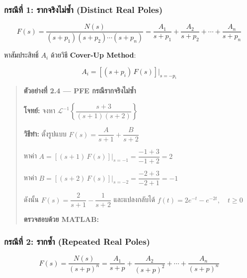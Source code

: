 \subsubsection{กรณีที่ 1: รากจริงไม่ซ้ำ (Distinct Real
Poles)}\label{uxe01uxe23uxe13uxe17-1-uxe23uxe32uxe01uxe08uxe23uxe07uxe44uxe21uxe0buxe33-distinct-real-poles}

\[F(s) = \frac{N(s)}{(s+p_1)(s+p_2)\cdots(s+p_n)} = \frac{A_1}{s+p_1} + \frac{A_2}{s+p_2} + \cdots + \frac{A_n}{s+p_n}\]

หาสัมประสิทธิ์ \(A_i\) ด้วยวิธี \textbf{Cover-Up Method}:

\[A_i = \left[(s+p_i)\,F(s)\right]\Big|_{s = -p_i}\]

\begin{quote}
\textbf{ตัวอย่างที่ 2.4 --- PFE กรณีรากจริงไม่ซ้ำ}

\textbf{โจทย์:} จงหา
\(\mathcal{L}^{-1}\!\left\{\dfrac{s+3}{(s+1)(s+2)}\right\}\)

\textbf{วิธีทำ:} ตั้งรูปแบบ \(F(s) = \dfrac{A}{s+1} + \dfrac{B}{s+2}\)

หาค่า \(A = [(s+1)\,F(s)]\big|_{s=-1} = \dfrac{-1+3}{-1+2} = 2\)

หาค่า \(B = [(s+2)\,F(s)]\big|_{s=-2} = \dfrac{-2+3}{-2+1} = -1\)

ดังนั้น \(F(s) = \dfrac{2}{s+1} - \dfrac{1}{s+2}\) และแปลงกลับได้
\(\boxed{f(t) = 2e^{-t} - e^{-2t},\quad t \geq 0}\)

\textbf{ตรวจสอบด้วย MATLAB:}

\begin{Shaded}
\begin{Highlighting}[]
 \OperatorTok{;}  \OperatorTok{=}\NormalTok{ (}\OperatorTok{+}\NormalTok{)}\OperatorTok{/}\NormalTok{((}\OperatorTok{+}\NormalTok{)}\OperatorTok{*}\NormalTok{(}\OperatorTok{+}\NormalTok{))}\OperatorTok{;} \NormalTok{(}\NormalTok{)}
\end{Highlighting}
\end{Shaded}
\end{quote}

\subsubsection{กรณีที่ 2: รากซ้ำ (Repeated Real
Poles)}\label{uxe01uxe23uxe13uxe17-2-uxe23uxe32uxe01uxe0buxe33-repeated-real-poles}

\[F(s) = \frac{N(s)}{(s+p)^n} = \frac{A_1}{s+p} + \frac{A_2}{(s+p)^2} + \cdots + \frac{A_n}{(s+p)^n}\]

